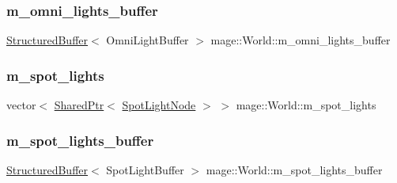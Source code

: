 \hypertarget{classmage_1_1_world_ade38f71376632c67686d1bfbbc6200ca}{}\label{classmage_1_1_world_ade38f71376632c67686d1bfbbc6200ca} 
\subsubsection{\texorpdfstring{m\+\_\+omni\+\_\+lights\+\_\+buffer}{m\_omni\_lights\_buffer}}
{\footnotesize\ttfamily \hyperlink{structmage_1_1_structured_buffer}{Structured\+Buffer}$<$ Omni\+Light\+Buffer $>$ mage\+::\+World\+::m\+\_\+omni\+\_\+lights\+\_\+buffer\hspace{0.3cm}{\ttfamily [private]}}

\hypertarget{classmage_1_1_world_aafb9aeddf2758f0fe49315a75303a8cf}{}\label{classmage_1_1_world_aafb9aeddf2758f0fe49315a75303a8cf} 
\subsubsection{\texorpdfstring{m\+\_\+spot\+\_\+lights}{m\_spot\_lights}}
{\footnotesize\ttfamily vector$<$ \hyperlink{namespacemage_a1e01ae66713838a7a67d30e44c67703e}{Shared\+Ptr}$<$ \hyperlink{namespacemage_ab9f49a82dd438032bb38c5436a657335}{Spot\+Light\+Node} $>$ $>$ mage\+::\+World\+::m\+\_\+spot\+\_\+lights\hspace{0.3cm}{\ttfamily [private]}}

\hypertarget{classmage_1_1_world_ae3ac3b5697519beb12ea24ab84d1c9fc}{}\label{classmage_1_1_world_ae3ac3b5697519beb12ea24ab84d1c9fc} 
\subsubsection{\texorpdfstring{m\+\_\+spot\+\_\+lights\+\_\+buffer}{m\_spot\_lights\_buffer}}
{\footnotesize\ttfamily \hyperlink{structmage_1_1_structured_buffer}{Structured\+Buffer}$<$ Spot\+Light\+Buffer $>$ mage\+::\+World\+::m\+\_\+spot\+\_\+lights\+\_\+buffer\hspace{0.3cm}{\ttfamily [private]}}


